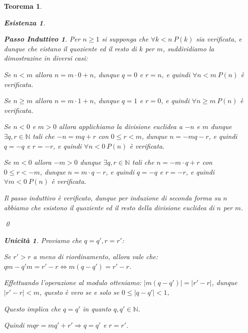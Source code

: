 \documentclass{article}
\makeatletter
\renewenvironment{proof}[1][\proofname]{\par
    \pushQED{\qed}%
    \normalfont \topsep6\p@\@plus6\p@\relax
    \trivlist
    \item\relax
    {\itshape
    #1\@addpunct{.}}\hspace\labelsep\ignorespaces
    }{%
    \popQED\endtrivlist\@endpefalse
}
\newtheorem{theorem}{Teorema}[part]
\newtheorem*{existence}{Esistenza}
\newtheorem*{uniqueness}{Unicità}
\newtheorem*{step}{Passo Induttivo}
\makeatother
\begin{document}
\begin{theorem}
\begin{proof}
\begin{existence}
\begin{step}
                Per \(n\geq1\) si supponga che \(\forall k<n\ P(k)\) sia verificata, e dunque che eistano il quoziente ed il resto di \(k\) per \(m\), suddividiamo la dimostrazine in diversi casi:
                \begin{list}{}{\leftmargin=1.5em}
                    \item Se \(n<m\) allora \(n=m\cdot 0+n\), dunque \(q=0\) e \(r=n\), e quindi \(\forall n<m\ P(n)\) è verificata.
                    \item Se \(n\geq m\) allora \(n=m\cdot 1+n\), dunque \(q=1\) e \(r=0\), e quindi \(\forall n\geq m\ P(n)\) è verificata.
                    \item Se \(n<0\) e \(m>0\) allora applichiamo la divisione euclidea a \(-n\) e \(m\) dunque \(\exists q,r\in\mathbb{N}\) tali che \(-n=mq+r\) con \(0\leq r<m\), dunque \(n=-mq-r\), e quindi \(q=-q\) e \(r=-r\), e quindi \(\forall n<0\ P(n)\) è verificata.
                    \item Se \(m<0\) allora \(-m>0\) dunque \(\exists q,r \in\mathbb{N}\) tali che \(n=-m\cdot q+r\) con \(0\leq r<-m\), dunque \(n=m\cdot q-r\), e quindi \(q=-q\) e \(r=-r\), e quindi \(\forall m<0\ P(n)\) è verificata.
                \end{list}
            \end{step}
            Il passo induttivo è verificato, dunque per induzione di seconda forma su \(n\) abbiamo che esistono il quoziente ed il resto della divisione euclidea di \(n\) per \(m\).
        \end{existence} 
        \qed
        \begin{uniqueness}
            Proviamo che \(q=q', r=r'\):
            \begin{list}{}{\leftmargin=1.5em}
                \item Se \(r'>r\) a meno di riordinamento, allora vale che: \(qm-q'm=r'-r\Leftrightarrow m(q-q')=r'-r\).
                \item Effettuando l'operazione al modulo otteniamo: \(|m(q-q')|=|r'-r|\), dunque \(|r'-r|<m\), questo è vero se e solo se \(0\leq|q-q'|<1\),
                \item Questo implica che \(q=q'\) in quanto \(q,q'\in\mathbb{N}\).
                \item Quindi \(mqr=mq'+r'\Rightarrow q=q'\) e \(r=r'\).
            \end{list}
        \end{uniqueness}
        \raggedleft{\pushQED{\ensuremath{\blacksquare}}}
    \end{proof}
\end{theorem}
\end{document}
